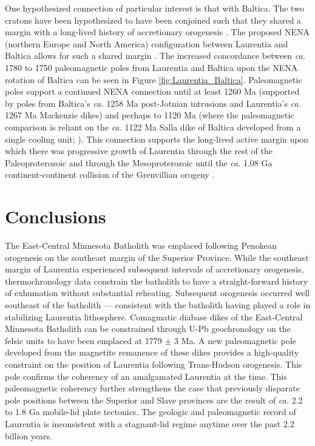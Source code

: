 \documentclass[draft]{agujournal2019}
\begin{document}
One hypothesized connection of particular interest is that with Baltica. The two cratons have been hypothesized to have been conjoined such that they shared a margin with a long-lived history of accretionary orogenesis \cite{Hoffman1997a, Karlstrom2001a}. The proposed NENA (northern Europe and North America) configuration between Laurentia and Baltica allows for such a shared margin \cite{Gower1990a, Buchan2000a, Evans2008a}. The increased concordance between \textit{ca.} 1780 to 1750 paleomagnetic poles from Laurentia and Baltica upon the NENA rotation of Baltica can be seen in Figure \ref{fig:Laurentia_Baltica}. Paleomagnetic poles support a continued NENA connection until at least 1260 Ma (supported by poles from Baltica's \textit{ca.} 1258 Ma post-Jotnian intrusions and Laurentia's \textit{ca.} 1267 Ma Mackenzie dikes) and perhaps to 1120 Ma (where the paleomagnetic comparison is reliant on the \textit{ca.} 1122 Ma Salla dike of Baltica developed from a single cooling unit; ). This connection supports the long-lived active margin upon which there was progressive growth of Laurentia through the rest of the Paleoproterozoic and through the Mesoproterozoic until the \textit{ca.} 1.08 Ga continent-continent collision of the Grenvillian orogeny \cite{Whitmeyer2007a}.

\section{Conclusions}

The East-Central Minnesota Batholith was emplaced following Penokean orogenesis on the southeast margin of the Superior Province. While the southeast margin of Laurentia experienced subsequent intervals of accretionary orogenesis, thermochronology data constrain the batholith to have a straight-forward history of exhumation without substantial reheating. Subsequent orogenesis occurred well southeast of the batholith --- consistent with the batholith having played a role in stabilizing Laurentia lithosphere.  Comagmatic diabase dikes of the East-Central Minnesota Batholith can be constrained through U-Pb geochronology on the felsic units to have been emplaced at 1779 $\pm$ 3 Ma. A new paleomagnetic pole developed from the magnetite remanence of these dikes provides a high-quality constraint on the position of Laurentia following Trans-Hudson orogenesis. This pole confirms the coherency of an amalgamated Laurentia at the time. This paleomagnetic coherency further strengthens the case that previously disparate pole positions between the Superior and Slave provinces are the result of \textit{ca.} 2.2 to 1.8 Ga mobile-lid plate tectonics. The geologic and paleomagnetic record of Laurentia is inconsistent with a stagnant-lid regime anytime over the past 2.2 billion years.
\end{document}
